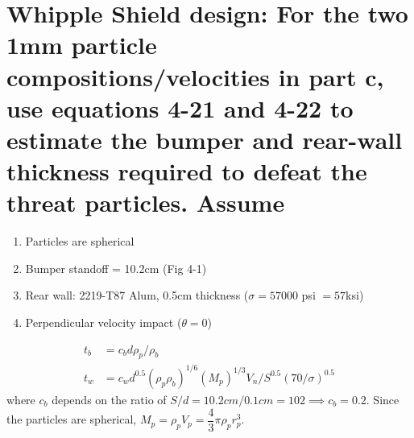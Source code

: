 \documentclass[onecolumn,10pt]{jhwhw}
\begin{document}
\part{Whipple Shield design: For the two 1mm particle compositions/velocities in part c, use equations 4-21 and 4-22 to estimate the bumper and rear-wall thickness required to defeat the threat particles. Assume}
\begin{enumerate}
\item Particles are spherical
\item Bumper standoff = 10.2cm (Fig 4-1)
\item Rear wall: 2219-T87 Alum, 0.5cm thickness ($\sigma = 57000$ psi $= 57 $ksi)
\item Perpendicular velocity impact ($\theta=0$)
\end{enumerate}
\begin{align*}
t_b &= c_b d \rho_p / \rho_b \\
t_w &= c_w d^{0.5} \left( \rho_p \rho_b \right)^{1/6} \left( M_p \right)^{1/3} V_n / S^{0.5} \left( 70/\sigma \right)^{0.5}
\end{align*}
where $c_b$ depends on the ratio of $S/d=10.2cm/0.1cm=102 \implies c_b = 0.2$. Since the particles are spherical, $M_p = \rho_p V_p = \dfrac{4}{3} \pi \rho_p r_p^3$.
\end{document}
